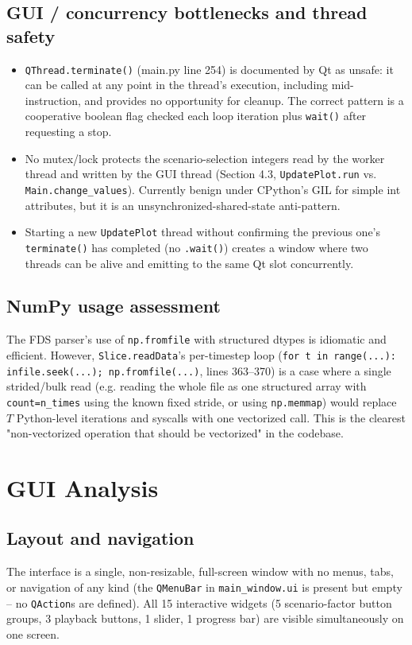 \documentclass[11pt,a4paper]{report}
\begin{document}
\section{GUI / concurrency bottlenecks and thread safety}
\begin{itemize}[nosep]
\item \texttt{QThread.terminate()} (main.py line 254) is documented by Qt as unsafe: it can be called
at any point in the thread's execution, including mid-instruction, and provides no opportunity for
cleanup. The correct pattern is a cooperative boolean flag checked each loop iteration plus
\texttt{wait()} after requesting a stop.
\item No mutex/lock protects the scenario-selection integers read by the worker thread and written by
the GUI thread (Section 4.3, \texttt{UpdatePlot.run} vs. \texttt{Main.change\_values}). Currently benign
under CPython's GIL for simple int attributes, but it is an unsynchronized-shared-state anti-pattern.
\item Starting a new \texttt{UpdatePlot} thread without confirming the previous one's
\texttt{terminate()} has completed (no \texttt{.wait()}) creates a window where two threads can be
alive and emitting to the same Qt slot concurrently.
\end{itemize}

\section{NumPy usage assessment}
The FDS parser's use of \texttt{np.fromfile} with structured dtypes is idiomatic and efficient. However,
\texttt{Slice.readData}'s per-timestep loop (\texttt{for t in range(...): infile.seek(...);
np.fromfile(...)}, lines 363--370) is a case where a single strided/bulk read (e.g. reading the whole
file as one structured array with \texttt{count=n\_times} using the known fixed stride, or using
\texttt{np.memmap}) would replace $T$ Python-level iterations and syscalls with one vectorized call.
This is the clearest "non-vectorized operation that should be vectorized" in the codebase.

\chapter{GUI Analysis}

\section{Layout and navigation}
\begin{factbox}
The interface is a single, non-resizable, full-screen window with no menus, tabs, or navigation of
any kind (the \texttt{QMenuBar} in \texttt{main\_window.ui} is present but empty -- no
\texttt{QAction}s are defined). All 15 interactive widgets (5 scenario-factor button groups, 3 playback
buttons, 1 slider, 1 progress bar) are visible simultaneously on one screen.
\end{factbox}
\end{document}
